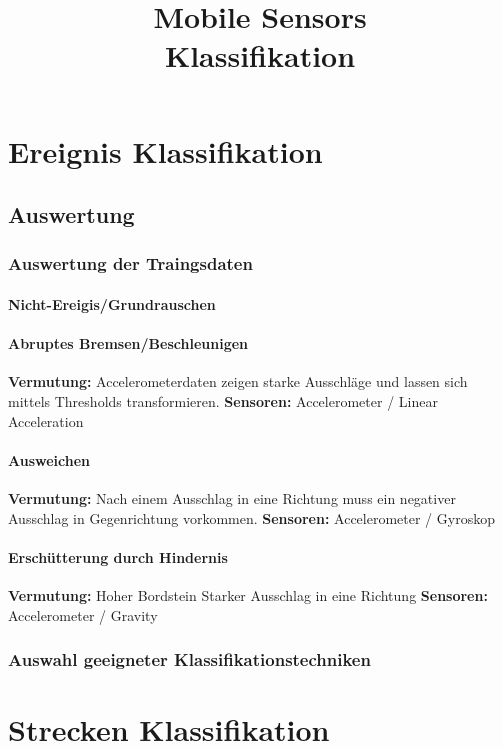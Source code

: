 \documentclass[a4paper]{scrreprt}
\title{Mobile Sensors\\Klassifikation}
\begin{document}
\maketitle

\tableofcontents



\chapter{Ereignis Klassifikation}





\section{Auswertung}
\subsection{Auswertung der Traingsdaten}
\subsubsection{Nicht-Ereigis/Grundrauschen}


\subsubsection{Abruptes Bremsen/Beschleunigen}
\textbf{Vermutung:}
Accelerometerdaten zeigen starke Ausschläge und lassen sich mittels Thresholds transformieren.
\newline
\textbf{Sensoren:}
Accelerometer / Linear Acceleration
\subsubsection{Ausweichen}
\textbf{Vermutung:}
Nach einem Ausschlag in eine Richtung muss ein negativer Ausschlag in Gegenrichtung vorkommen.
\newline
\textbf{Sensoren:}
Accelerometer / Gyroskop

\subsubsection{Erschütterung durch Hindernis}
\textbf{Vermutung:}
Hoher Bordstein
Starker Ausschlag in eine Richtung
\newline
\textbf{Sensoren:}
Accelerometer / Gravity

\subsection{Auswahl geeigneter Klassifikationstechniken}

\chapter{Strecken Klassifikation}
\end{document}
